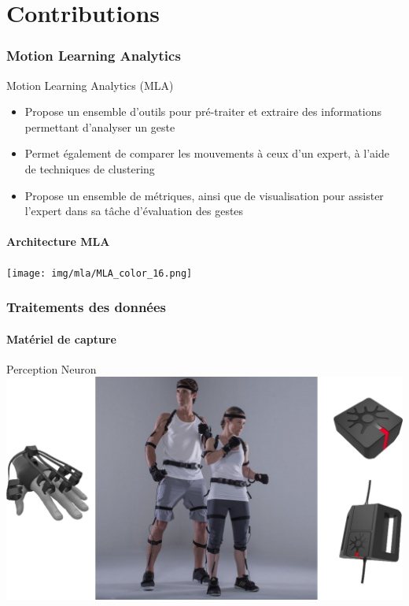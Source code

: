 \documentclass[svgnames]{beamer}
\begin{document}
	\part{Contributions}
	\section{Motion Learning Analytics}
	\begin{frame}{\secname}
		\begin{block}{Motion Learning Analytics (MLA)}
			\begin{itemize}[label=$\bullet$]
				\item Propose un ensemble d'outils pour pré-traiter et extraire des informations permettant d'analyser un geste
				\item Permet également de comparer les mouvements à ceux d'un expert, à l'aide de techniques de clustering
				\item Propose un ensemble de métriques, ainsi que de visualisation pour assister l'expert dans sa tâche d'évaluation des gestes
			\end{itemize}
		\end{block}
	\end{frame}
	
	\subsection{Architecture MLA}
	\begin{frame}{\subsecname}
	\centering
		\texttt{[image: img/mla/MLA\_color\_16.png]}
	\end{frame}

	\section{Traitements des données}
	
	\subsection{Matériel de capture}
	\begin{frame}{Perception Neuron}
		\centering
		\includegraphics[scale=0.4]{img/Perception_Neuron.png}
	\end{frame}
	
\end{document}
